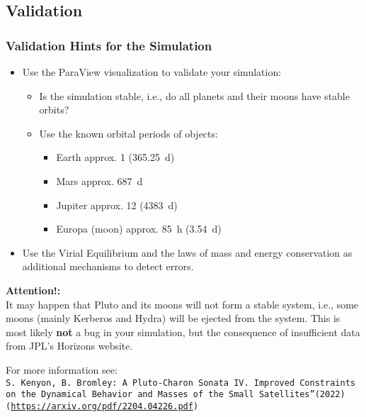 \subsection{Validation}
\begin{frame}[fragile]
  \frametitle{Validation Hints for the Simulation}
  \begin{itemize}
    \item Use the ParaView visualization to validate your simulation:
    \begin{itemize}
        \item Is the simulation stable, i.e., do all planets and their moons have stable orbits?
        \item Use the known orbital periods of objects:
        \begin{itemize}
            \item Earth approx. \SI{1}{\year} (\SI{365.25}{\day})
            \item Mars approx. \SI{687}{\day}
            \item Jupiter approx. \SI{12}{\year} (\SI{4383}{\day}) 
            \item Europa (moon) approx. \SI{85}{\hour} (\SI{3.54}{\day})
        \end{itemize}
    \end{itemize}
    \item Use the Virial Equilibrium and the laws of mass and energy conservation as additional mechanisms to detect errors.
  \end{itemize}
  \vfill
  \pause
  \textbf{Attention!:}\\
  It may happen that Pluto and its moons will not form a stable system, i.e., some moons (mainly Kerberos and Hydra) will be ejected from the system. This is most likely \textbf{not} a bug in your simulation, but the consequence of insufficient data from JPL's Horizons website.\\[-.5em]
  \begin{spacing}{0.8}
      \setfontsize{8pt}
      For more information see: \\
      \texttt{S. Kenyon, B. Bromley: A Pluto-Charon Sonata IV. Improved Constraints on the Dynamical Behavior and Masses of the Small Satellites\textquotedblright (2022) (\url{https://arxiv.org/pdf/2204.04226.pdf})}
    \end{spacing}
\end{frame}
